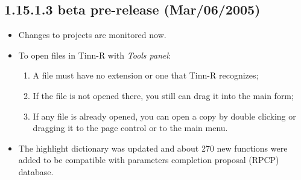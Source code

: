 \subsection*{1.15.1.3 beta pre-release (Mar/06/2005)}
\begin{itemize}
  \item Changes to projects are monitored now.
  \item To open files in Tinn-R with \textit{Tools panel}:
    \begin{enumerate}
      \item A file must have no extension or one that Tinn-R recognizes;
      \item If the file is not opened there, you still can drag it into the main form;
      \item If any file is already opened, you can open a copy by double clicking or dragging it
        to the page control or to the main menu.
    \end{enumerate}
  \item The \RR{} highlight dictionary was updated and about 270 new functions were added to be
    compatible with \RR{} parameters completion proposal (RPCP) database.
\end{itemize}


